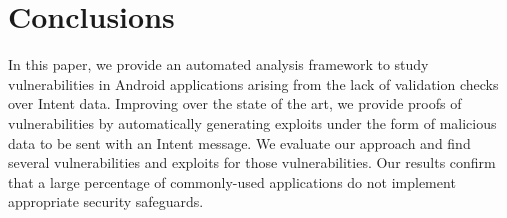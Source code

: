 \section{Conclusions}
\label{sec:concl}

In this paper, we provide an automated analysis framework to study vulnerabilities in Android applications arising from the lack of validation checks over Intent data. Improving over the state of the art, we provide proofs of vulnerabilities by automatically generating exploits under the form of malicious data to be sent with an Intent message. %
We evaluate our approach and find several vulnerabilities and exploits for those vulnerabilities. Our results confirm that a large percentage of commonly-used applications do not implement appropriate security safeguards.